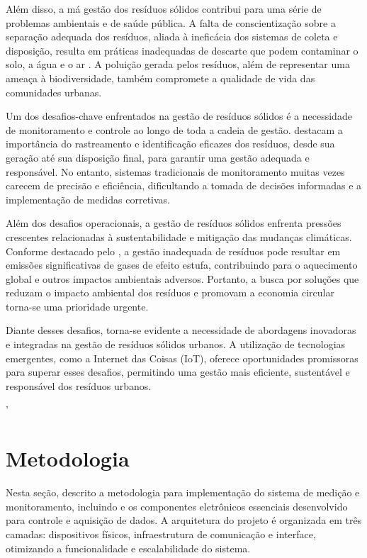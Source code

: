 \documentclass[12pt]{article}
\begin{document}
Além disso, a má gestão dos resíduos sólidos contribui para uma série de problemas ambientais e de saúde pública. A falta de conscientização sobre a separação adequada dos resíduos, aliada à ineficácia dos sistemas de coleta e disposição, resulta em práticas inadequadas de descarte que podem contaminar o solo, a água e o ar \cite{OPAS}. A poluição gerada pelos resíduos, além de representar uma ameaça à biodiversidade, também compromete a qualidade de vida das comunidades urbanas.

Um dos desafios-chave enfrentados na gestão de resíduos sólidos é a necessidade de monitoramento e controle ao longo de toda a cadeia de gestão. \cite{HANNAN20112406} destacam a importância do rastreamento e identificação eficazes dos resíduos, desde sua geração até sua disposição final, para garantir uma gestão adequada e responsável. No entanto, sistemas tradicionais de monitoramento muitas vezes carecem de precisão e eficiência, dificultando a tomada de decisões informadas e a implementação de medidas corretivas.

Além dos desafios operacionais, a gestão de resíduos sólidos enfrenta pressões crescentes relacionadas à sustentabilidade e mitigação das mudanças climáticas. Conforme destacado pelo \cite{IPCC_2023}, a gestão inadequada de resíduos pode resultar em emissões significativas de gases de efeito estufa, contribuindo para o aquecimento global e outros impactos ambientais adversos. Portanto, a busca por soluções que reduzam o impacto ambiental dos resíduos e promovam a economia circular torna-se uma prioridade urgente.

Diante desses desafios, torna-se evidente a necessidade de abordagens inovadoras e integradas na gestão de resíduos sólidos urbanos. A utilização de tecnologias emergentes, como a Internet das Coisas (IoT), oferece oportunidades promissoras para superar esses desafios, permitindo uma gestão mais eficiente, sustentável e responsável dos resíduos urbanos.

'\section{Metodologia}

Nesta seção, descrito a metodologia para implementação do sistema de medição e monitoramento, incluindo e os componentes eletrônicos essenciais desenvolvido para controle e aquisição de dados. A arquitetura do projeto é organizada em três camadas: dispositivos físicos, infraestrutura de comunicação e interface, otimizando a funcionalidade e escalabilidade do sistema.
\end{document}
